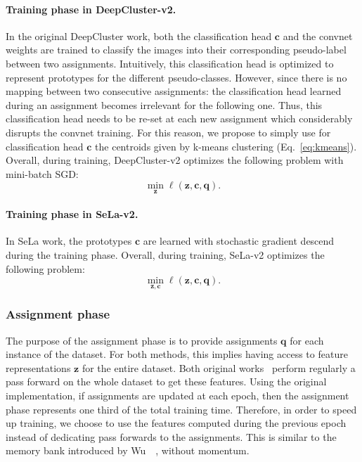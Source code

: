 \paragraph{Training phase in DeepCluster-v2.}
In the original DeepCluster work, both the classification head $\mathbf{c}$ and the convnet weights are trained to classify the images into their corresponding pseudo-label between two assignments.
Intuitively, this classification head is optimized to represent prototypes for the different pseudo-classes.
However, since there is no mapping between two consecutive assignments: the classification head learned during an assignment becomes irrelevant for the following one.
Thus, this classification head needs to be re-set at each new assignment which considerably disrupts the convnet training.
For this reason, we propose to simply use for classification head $\mathbf{c}$ the centroids given by k-means clustering (Eq.~\ref{eq:kmeans}).
Overall, during training, DeepCluster-v2 optimizes the following problem with mini-batch SGD:
\begin{equation}
\min_{\mathbf{z}} \ell(\mathbf{z}, \mathbf{c}, \mathbf{q}).
\end{equation}

\paragraph{Training phase in SeLa-v2.}
In SeLa work, the prototypes $\mathbf{c}$ are learned with stochastic gradient descend during the training phase.
Overall, during training, SeLa-v2 optimizes the following problem:
\begin{equation}
\min_{\mathbf{z},\mathbf{c}} \ell(\mathbf{z}, \mathbf{c}, \mathbf{q}).
\end{equation}

\subsubsection{Assignment phase}
The purpose of the assignment phase is to provide assignments $\mathbf{q}$ for each instance of the dataset.
For both methods, this implies having access to feature representations $\mathbf{z}$ for the entire dataset.
Both original works~\cite{caron2018deep,asano2019self} perform regularly a pass forward on the whole dataset to get these features.
Using the original implementation, if assignments are updated at each epoch, then the assignment phase represents one third of the total training time.
Therefore, in order to speed up training, we choose to use the features computed during the previous epoch instead of dedicating pass forwards to the assignments.
This is similar to the memory bank introduced by Wu~\etal~\cite{wu2018unsupervised}, without momentum.

